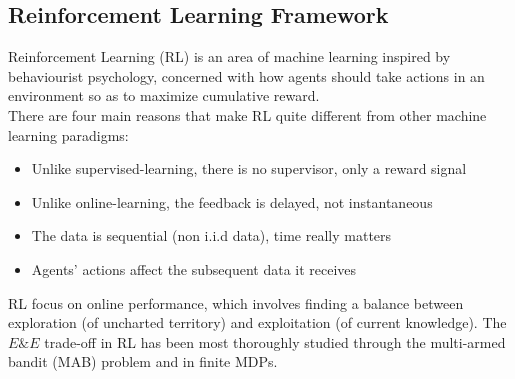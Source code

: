 \documentclass[sigconf]{acmart}
\begin{document}
\subsection{Reinforcement Learning Framework}
Reinforcement Learning (RL) is an area of machine learning inspired by behaviourist psychology, concerned with how agents should take actions in an environment so as to maximize cumulative reward.\\
There are four main reasons that make RL quite different from other machine learning paradigms:\cite{David_Silver:intro_RL}
\begin{itemize}
\item Unlike supervised-learning, there is no supervisor, only a reward signal
\item Unlike online-learning, the feedback is delayed, not instantaneous
\item The data is sequential (non i.i.d data), time really matters
\item Agents' actions affect the subsequent data it receives
\end{itemize}
RL focus on online performance, which involves finding a balance between exploration (of uncharted territory) and exploitation (of current knowledge). The $E\&E$ trade-off in RL has been most thoroughly studied through the multi-armed bandit (MAB) problem and in finite MDPs.
\end{document}
